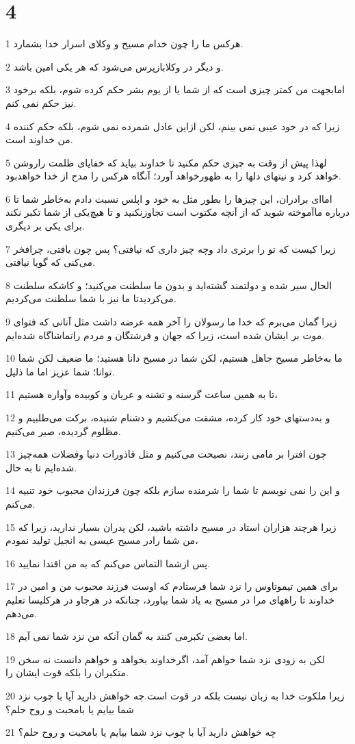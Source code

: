 \chapter{4}

\par 1 هرکس ما را چون خدام مسیح و وکلای اسرار خدا بشمارد.
\par 2 و دیگر در وکلابازپرس می‌شود که هر یکی امین باشد.
\par 3 امابجهت من کمتر چیزی است که از شما یا از یوم بشر حکم کرده شوم، بلکه برخود نیز حکم نمی کنم.
\par 4 زیرا که در خود عیبی نمی بینم، لکن ازاین عادل شمرده نمی شوم، بلکه حکم کننده من خداوند است.
\par 5 لهذا پیش از وقت به چیزی حکم مکنید تا خداوند بیاید که خفایای ظلمت راروشن خواهد کرد و نیتهای دلها را به ظهورخواهد آورد؛ آنگاه هرکس را مدح از خدا خواهدبود.
\par 6 اما‌ای برادران، این چیزها را بطور مثل به خود و اپلس نسبت دادم به‌خاطر شما تا درباره ماآموخته شوید که از آنچه مکتوب است تجاوزنکنید و تا هیچ‌یکی از شما تکبر نکند برای یکی بر دیگری.
\par 7 زیرا کیست که تو را برتری داد وچه چیز داری که نیافتی؟ پس چون یافتی، چرافخر می‌کنی که گویا نیافتی.
\par 8 الحال سیر شده و دولتمند گشته‌اید و بدون ما سلطنت می‌کنید؛ و کاشکه سلطنت می‌کردیدتا ما نیز با شما سلطنت می‌کردیم.
\par 9 زیرا گمان می‌برم که خدا ما رسولان را آخر همه عرضه داشت مثل آنانی که فتوای موت بر ایشان شده است، زیرا که جهان و فرشتگان و مردم راتماشاگاه شده‌ایم.
\par 10 ما به‌خاطر مسیح جاهل هستیم، لکن شما در مسیح دانا هستید؛ ما ضعیف لکن شما توانا؛ شما عزیز اما ما ذلیل.
\par 11 تا به همین ساعت گرسنه و تشنه و عریان و کوبیده وآواره هستیم،
\par 12 و به‌دستهای خود کار کرده، مشقت می‌کشیم و دشنام شنیده، برکت می‌طلبیم و مظلوم گردیده، صبر می‌کنیم.
\par 13 چون افترا بر مامی زنند، نصیحت می‌کنیم و مثل قاذورات دنیا وفضلات همه‌چیز شده‌ایم تا به حال.
\par 14 و این را نمی نویسم تا شما را شرمنده سازم بلکه چون فرزندان محبوب خود تنبیه می‌کنم.
\par 15 زیرا هرچند هزاران استاد در مسیح داشته باشید، لکن پدران بسیار ندارید، زیرا که من شما رادر مسیح عیسی به انجیل تولید نمودم،
\par 16 پس ازشما التماس می‌کنم که به من اقتدا نمایید.
\par 17 برای همین تیموتاوس را نزد شما فرستادم که اوست فرزند محبوب من و امین در خداوند تا راههای مرا در مسیح به یاد شما بیاورد، چنانکه در هرجاو در هرکلیسا تعلیم می‌دهم.
\par 18 اما بعضی تکبرمی کنند به گمان آنکه من نزد شما نمی آیم.
\par 19 لکن به زودی نزد شما خواهم آمد، اگرخداوند بخواهد و خواهم دانست نه سخن متکبران را بلکه قوت ایشان را.
\par 20 زیرا ملکوت خدا به زبان نیست بلکه در قوت است.چه خواهش دارید آیا با چوب نزد شما بیایم یا بامحبت و روح حلم؟
\par 21 چه خواهش دارید آیا با چوب نزد شما بیایم یا بامحبت و روح حلم؟


